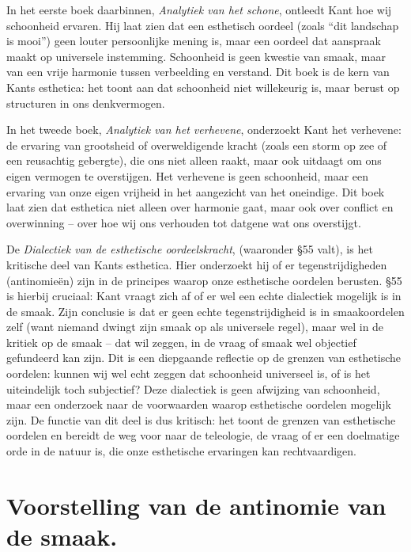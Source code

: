 \begin{mdframed}[leftmargin=0pt,rightmargin=0pt,backgroundcolor=blue!6,linecolor=white,innertopmargin=6pt,innerbottommargin=6pt]
In het eerste boek daarbinnen, \textit{Analytiek van het schone}, ontleedt Kant hoe wij schoonheid ervaren. Hij laat zien dat een esthetisch oordeel (zoals ``dit landschap is mooi'') geen louter persoonlijke mening is, maar een oordeel dat aanspraak maakt op universele instemming. Schoonheid is geen kwestie van smaak, maar van een vrije harmonie tussen verbeelding en verstand. Dit boek is de kern van Kants esthetica: het toont aan dat schoonheid niet willekeurig is, maar berust op structuren in ons denkvermogen.

In het tweede boek, \textit{Analytiek van het verhevene}, onderzoekt Kant het verhevene: de ervaring van grootsheid of overweldigende kracht (zoals een storm op zee of een reusachtig gebergte), die ons niet alleen raakt, maar ook uitdaagt om ons eigen vermogen te overstijgen. Het verhevene is geen schoonheid, maar een ervaring van onze eigen vrijheid in het aangezicht van het oneindige. Dit boek laat zien dat esthetica niet alleen over harmonie gaat, maar ook over conflict en overwinning – over hoe wij ons verhouden tot datgene wat ons overstijgt.

De \textit{Dialectiek van de esthetische oordeelskracht}, (waaronder §55 valt), is het kritische deel van Kants esthetica. Hier onderzoekt hij of er tegenstrijdigheden (antinomieën) zijn in de principes waarop onze esthetische oordelen berusten. §55 is hierbij cruciaal: Kant vraagt zich af of er wel een echte dialectiek mogelijk is in de smaak. Zijn conclusie is dat er geen echte tegenstrijdigheid is in smaakoordelen zelf (want niemand dwingt zijn smaak op als universele regel), maar wel in de kritiek op de smaak – dat wil zeggen, in de vraag of smaak wel objectief gefundeerd kan zijn. Dit is een diepgaande reflectie op de grenzen van esthetische oordelen: kunnen wij wel echt zeggen dat schoonheid universeel is, of is het uiteindelijk toch subjectief? Deze dialectiek is geen afwijzing van schoonheid, maar een onderzoek naar de voorwaarden waarop esthetische oordelen mogelijk zijn.
De functie van dit deel is dus kritisch: het toont de grenzen van esthetische oordelen en bereidt de weg voor naar de teleologie, de vraag of er een doelmatige orde in de natuur is, die onze esthetische ervaringen kan rechtvaardigen.

\end{mdframed}

\section{Voorstelling van de antinomie van de smaak.}

